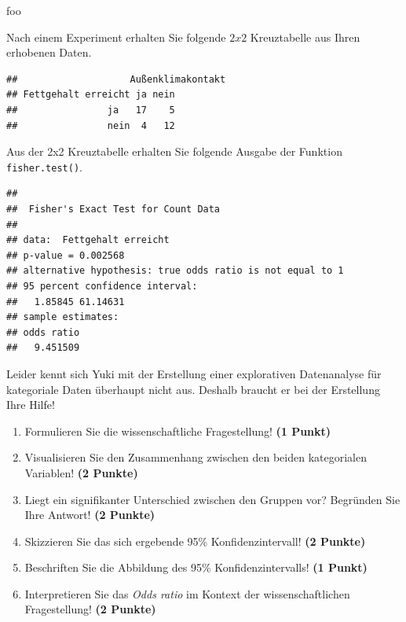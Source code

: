 \documentclass[a4paper, 9pt]{scrartcl}\usepackage[]{graphicx}\usepackage[]{xcolor}
\makeatletter
\newenvironment{kframe}{%
 \def\at@end@of@kframe{}%
 \ifinner\ifhmode%
  \def\at@end@of@kframe{\end{minipage}}%
  \begin{minipage}{\columnwidth}%
 \fi\fi%
 \def\FrameCommand##1{\hskip\@totalleftmargin \hskip-\fboxsep
 \colorbox{shadecolor}{##1}\hskip-\fboxsep
     \hskip-\linewidth \hskip-\@totalleftmargin \hskip\columnwidth}%
 \MakeFramed {\advance\hsize-\width
   \@totalleftmargin\z@ \linewidth\hsize
   \@setminipage}}%
 {\par\unskip\endMakeFramed%
 \at@end@of@kframe}
\newenvironment{knitrout}{}{} %
\makeatother
\begin{document}
foo

Nach einem Experiment erhalten Sie folgende $2x2$ Kreuztabelle aus Ihren erhobenen Daten.

\begin{knitrout}
\color{fgcolor}\begin{kframe}
\begin{verbatim}
##                    Außenklimakontakt
## Fettgehalt erreicht ja nein
##                ja   17    5
##                nein  4   12
\end{verbatim}
\end{kframe}
\end{knitrout}

Aus der 2x2 Kreuztabelle erhalten Sie folgende \Rlogo Ausgabe der Funktion
\texttt{fisher.test()}.

\begin{knitrout}
\color{fgcolor}\begin{kframe}
\begin{verbatim}
## 
## 	Fisher's Exact Test for Count Data
## 
## data:  Fettgehalt erreicht
## p-value = 0.002568
## alternative hypothesis: true odds ratio is not equal to 1
## 95 percent confidence interval:
##   1.85845 61.14631
## sample estimates:
## odds ratio 
##   9.451509
\end{verbatim}
\end{kframe}
\end{knitrout}

Leider kennt sich Yuki mit der Erstellung einer explorativen Datenanalyse für kategoriale Daten überhaupt nicht aus. Deshalb braucht er bei der Erstellung Ihre Hilfe!

\begin{enumerate}
\item Formulieren Sie die wissenschaftliche Fragestellung! \textbf{(1 Punkt)}
\item Visualisieren Sie den Zusammenhang zwischen den beiden kategorialen Variablen! \textbf{(2 Punkte)}
\item Liegt ein signifikanter Unterschied zwischen den Gruppen vor? Begründen Sie Ihre Antwort! \textbf{(2 Punkte)}
\item Skizzieren Sie das sich ergebende 95\% Konfidenzintervall! \textbf{(2 Punkte)}
\item Beschriften Sie die Abbildung des 95\% Konfidenzintervalls! \textbf{(1 Punkt)} 
\item Interpretieren Sie das \textit{Odds ratio} im Kontext der wissenschaftlichen Fragestellung! \textbf{(2 Punkte)} 
\end{enumerate}
 
\end{document}
